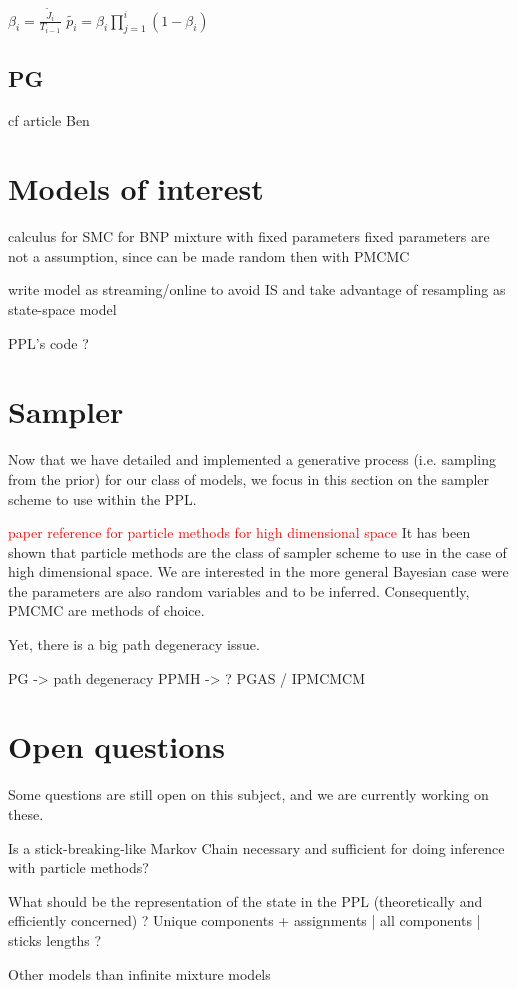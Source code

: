 $\beta_i = \frac{\tilde{J}_i}{T_{i-1}}$
$\tilde{p_i} = \beta_i \prod_{j=1}^i (1-\beta_i)$


\subsection{PG}
cf article Ben

\section{Models of interest}
calculus for SMC for BNP mixture with fixed parameters
fixed parameters are not a assumption, since can be made random then with PMCMC

write model as streaming/online to avoid IS and take advantage of resampling
as state-space model

PPL's code ?

\section{Sampler}
Now that we have detailed and implemented a generative process (i.e. sampling from the prior) for our class of models, we focus in this section on the sampler scheme to use within the \gls{PPL}.

\textcolor{red}{paper reference for particle methods for high dimensional space}
It has been shown that particle methods are the class of sampler scheme to use in the case of high dimensional space.
We are interested in the more general Bayesian case were the parameters are also random variables and to be inferred. Consequently, \acrlong{PMCMC} are methods of choice.

Yet, there is a big path degeneracy issue.

PG -> path degeneracy
PPMH -> ?
PGAS / IPMCMCM


\section{Open questions}
Some questions are still open on this subject, and we are currently working on these.

Is a stick-breaking-like Markov Chain necessary and sufficient for doing inference with particle methods?


What should be the representation of the state in the PPL (theoretically and efficiently concerned) ? Unique components + assignments | all components | sticks lengths ? 

Other models than infinite mixture models  
